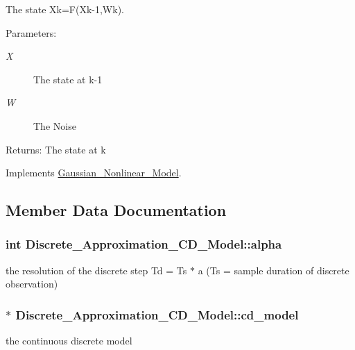 The state Xk=F(Xk-1,Wk). 

\begin{Desc}
\item[Parameters:]
\begin{description}
\item[{\em X}]The state at k-1 \item[{\em W}]The Noise\end{description}
\end{Desc}
\begin{Desc}
\item[Returns:]The state at k \end{Desc}


Implements \hyperlink{class_gaussian___nonlinear___model_df0e6cf50a8d5fdb6decd05046867cd8}{Gaussian\_\-Nonlinear\_\-Model}.

\subsection{Member Data Documentation}
\hypertarget{class_discrete___approximation___c_d___model_8200bfe0f27222f170057ca6d0ca123c}{
\subsubsection[{alpha}]{\setlength{\rightskip}{0pt plus 5cm}int {\bf Discrete\_\-Approximation\_\-CD\_\-Model::alpha}}}
\label{class_discrete___approximation___c_d___model_8200bfe0f27222f170057ca6d0ca123c}


the resolution of the discrete step Td = Ts $\ast$ a (Ts = sample duration of discrete observation) 

\hypertarget{class_discrete___approximation___c_d___model_874071f4daae1dce9b15aaf5fc133846}{
\subsubsection[{cd\_\-model}]{$\ast$ {\bf Discrete\_\-Approximation\_\-CD\_\-Model::cd\_\-model}}}
\label{class_discrete___approximation___c_d___model_874071f4daae1dce9b15aaf5fc133846}


the continuous discrete model 

